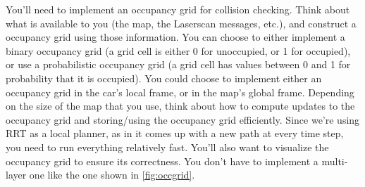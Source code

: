 \documentclass[letter]{article}
\begin{document}
You'll need to implement an occupancy grid for collision checking. Think about what is available to you (the map, the Laserscan messages, etc.), and construct a occupancy grid using those information. You can choose to either implement a binary occupancy grid (a grid cell is either 0 for unoccupied, or 1 for occupied), or use a probabilistic occupancy grid (a grid cell has values between 0 and 1 for probability that it is occupied). You could choose to implement either an occupancy grid in the car's local frame, or in the map's global frame. Depending on the size of the map that you use, think about how to compute updates to the occupancy grid and storing/using the occupancy grid efficiently. Since we're using RRT as a local planner, as in it comes up with a new path at every time step, you need to run everything relatively fast.  You'll also want to visualize the occupancy grid to ensure its correctness. You don't have to implement a multi-layer one like the one shown in \ref{fig:occgrid}.
\end{document}
